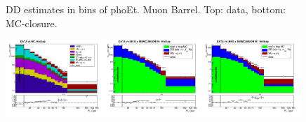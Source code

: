 \begin{figure}[htb]
\begin{center}
  \caption{DD estimates in bins of phoEt. Muon Barrel. Top: data, bottom: MC-closure. }
  \end{center}
\end{figure}

\begin{figure}[htb]
  \begin{center}
   \includegraphics[width=0.33\textwidth]{../figs/figs_v11/MUON_WGamma/PrepareYields/c_TotalDATAvsMC_Endcap__phoEt.png}\includegraphics[width=0.33\textwidth]{../figs/figs_v11/MUON_WGamma/PrepareYields/c_DATAvsBkgPlusSigMCc_MUON_WGamma_TEMPL_CHISO_UNblind__Endcap__phoEt.png}\includegraphics[width=0.33\textwidth]{../figs/figs_v11/MUON_WGamma/PrepareYields/c_DATAvsBkgPlusSigMCc_MUON_WGamma_TEMPL_SIHIH_UNblind__Endcap__phoEt.png}

\end{center}
\end{figure}
